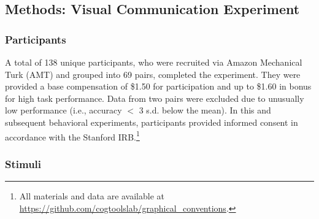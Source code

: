 \documentclass[10pt,letterpaper]{article}
\begin{document}

\subsection{Methods: Visual Communication Experiment}

\subsubsection{Participants} A total of 138 unique participants, who were recruited via Amazon Mechanical Turk (AMT) and grouped into 69 pairs, completed the experiment.
They were provided a base compensation of \$1.50 for participation and up to \$1.60 in bonus for high task performance.
Data from two pairs were excluded due to unusually low performance (i.e., accuracy $<$ 3 s.d. below the mean).
In this and subsequent behavioral experiments, participants provided informed consent in accordance with the Stanford IRB.\footnote{All materials and data are available at \url{https://github.com/cogtoolslab/graphical_conventions}.}

\subsubsection{Stimuli} 
\end{document}

